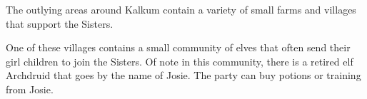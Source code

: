 The outlying areas around Kalkum contain a variety of small farms and villages that support the Sisters.

One of these villages contains a small community of elves that often send their girl children to join the Sisters.
Of note in this community, there is a retired elf Archdruid that goes by the name of Josie.
The party can buy potions or training from Josie.
